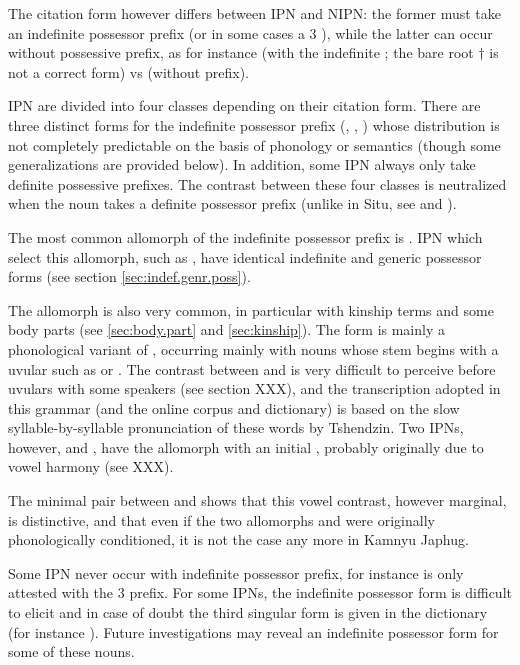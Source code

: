 The citation form however differs between IPN and NIPN: the former must take an indefinite possessor prefix (or in some cases a 3\sg{} ), while the latter can occur without possessive prefix, as for instance  (with the indefinite ; the bare root $\dagger$ is not a correct form) vs  (without prefix).

IPN are divided into four classes depending on their citation form. There are three distinct forms for the indefinite possessor prefix (, , ) whose distribution is not completely predictable on the basis of phonology or semantics (though some generalizations are provided below). In addition, some IPN always only take definite possessive prefixes. The contrast between these four classes is neutralized when the noun takes a definite possessor prefix (unlike in Situ, see \citealt[168-169]{linxr93jiarongen} and \citealt[118-119]{prins16kyomkyo}).

The most common allomorph of the indefinite possessor prefix is . IPN which select this allomorph, such as , have identical indefinite and generic possessor forms (see section \ref{sec:indef.genr.poss}).

The allomorph  is also very common, in particular with kinship terms and some body parts (see \ref{sec:body.part} and \ref{sec:kinship}). The form  is mainly a phonological variant of , occurring mainly with nouns whose stem begins with a uvular such as  or . The contrast between  and  is very difficult to perceive before uvulars with some speakers (see section XXX), and the transcription adopted in this grammar (and the online corpus and dictionary) is based on the slow syllable-by-syllable pronunciation of these words by Tshendzin. Two IPNs, however,  and , have the  allomorph with an initial , probably originally due to vowel harmony (see XXX).

The minimal pair between  and  shows that this vowel contrast, however marginal, is distinctive, and that even if the two allomorphs  and  were originally phonologically conditioned, it is not the case any more in Kamnyu Japhug.

Some IPN never occur with indefinite possessor prefix, for instance  is only attested with the 3\sg{}  prefix. For some IPNs, the indefinite possessor form is difficult to elicit and in case of doubt the third singular form is given in the dictionary \citet{jacques16japhug} (for instance ). Future investigations may reveal an indefinite possessor form for some of these nouns.

